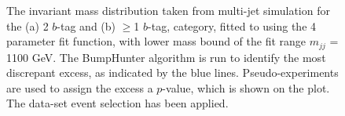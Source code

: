 \begin{figure}[!ht]
  \begin{center}
   \captionsetup[subfigure]{aboveskip=0pt,justification=centering}
  \end{center}
  \caption{ The invariant mass distribution taken from multi-jet simulation for the (a) 2 $b$-tag and (b) $\geq$1 $b$-tag,
   category, fitted to using the 4 parameter fit function, with lower mass bound of the fit range $m_{jj}$ = 1100 GeV.
   The BumpHunter algorithm is run to identify the most discrepant excess, as indicated by the blue lines.
   Pseudo-experiments are used to assign the excess a \mbox{$p$-value}, which is shown on the plot.    
   The \summer{} data-set event selection has been applied.}
 \label{fig:Short_4para_1100_figure1}
\end{figure}


